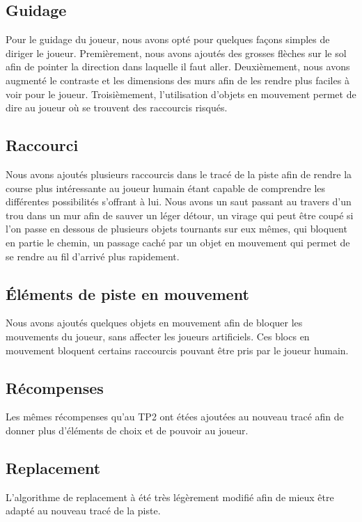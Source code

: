\documentclass[a4paper, 12pt]{article} %
\begin{document}
\subsection*{Guidage}
Pour le guidage du joueur, nous avons opté pour quelques façons simples de diriger le joueur.	Premièrement, nous avons ajoutés des grosses flèches sur le sol afin de pointer la direction dans laquelle il faut aller. Deuxièmement, nous avons augmenté le contraste et les dimensions des murs afin de les rendre plus faciles à voir pour le joueur. Troisièmement, l'utilisation d'objets en mouvement permet de dire au joueur où se trouvent des raccourcis risqués.
\subsection*{Raccourci}
Nous avons ajoutés plusieurs raccourcis dans le tracé de la piste afin de rendre la course plus intéressante au joueur humain étant capable de comprendre les différentes possibilités s'offrant à lui. Nous avons un saut passant au travers d'un trou dans un mur afin de sauver un léger détour, un virage qui peut être coupé si l'on passe en dessous de plusieurs objets tournants sur eux mêmes, qui bloquent en partie le chemin, 	un passage caché par un objet en mouvement qui permet de se rendre au fil d'arrivé plus rapidement.
\subsection*{Éléments de piste en mouvement}
Nous avons ajoutés quelques objets en mouvement afin de bloquer les mouvements du joueur, sans affecter les joueurs artificiels. Ces blocs en mouvement bloquent certains raccourcis pouvant être pris par le joueur humain.
\subsection*{Récompenses}
Les mêmes récompenses qu'au TP2 ont étées ajoutées au nouveau tracé afin de donner plus d'éléments de choix et de pouvoir au joueur.
\subsection*{Replacement}
L'algorithme de replacement à été très légèrement modifié afin de mieux être adapté au nouveau tracé de la piste.
\vspace{10pt}
\end{document}
